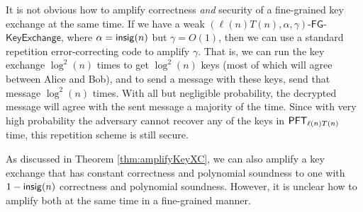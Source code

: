 	

\begin{remark} It is not obvious how to amplify correctness \emph{and} security of a fine-grained key exchange at the same time. If we have a weak $(\ell(n)T(n), \alpha, \gamma)$-$\mathsf{FG}$-$\mathsf{KeyExchange}$, where $\alpha = \mathsf{insig}(n)$ but $\gamma = O(1)$, then we can use a standard repetition error-correcting code to amplify $\gamma$. That is, we can run the key exchange $\log^2(n)$ times to get $\log^2(n)$ keys (most of which will agree between Alice and Bob), and to send a message with these keys, send that message $\log^2(n)$ times. With all but negligible probability, the decrypted message will agree with the sent message a majority of the time.
Since with very high probability the adversary cannot recover any of the keys in $\mathsf{PFT}_{\ell(n)T(n)}$ time, this repetition scheme is still secure.

As discussed in Theorem \ref{thm:amplifyKeyXC}, we can also amplify a key exchange that has constant correctness and polynomial soundness to one with $1 - \mathsf{insig}(n)$ correctness and polynomial soundness. However, it is unclear how to amplify both at the same time in a fine-grained manner.
\end{remark}

